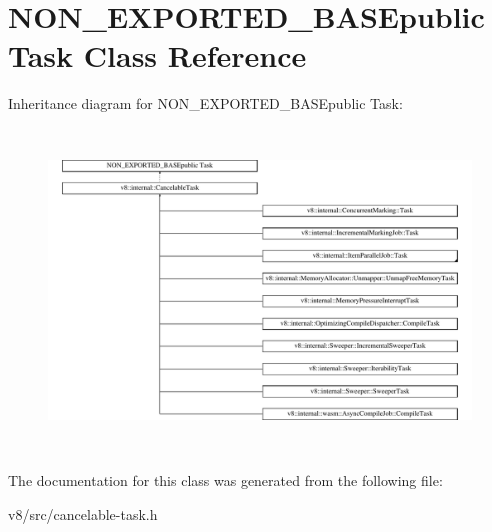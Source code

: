 \hypertarget{classNON__EXPORTED__BASEpublic_01Task}{}\section{N\+O\+N\+\_\+\+E\+X\+P\+O\+R\+T\+E\+D\+\_\+\+B\+A\+S\+Epublic Task Class Reference}
\label{classNON__EXPORTED__BASEpublic_01Task}
Inheritance diagram for N\+O\+N\+\_\+\+E\+X\+P\+O\+R\+T\+E\+D\+\_\+\+B\+A\+S\+Epublic Task\+:\begin{figure}[H]
\begin{center}
\leavevmode
\includegraphics[height=8.593350cm]{classNON__EXPORTED__BASEpublic_01Task}
\end{center}
\end{figure}


The documentation for this class was generated from the following file\+:\begin{DoxyCompactItemize}
\item 
v8/src/cancelable-\/task.\+h\end{DoxyCompactItemize}
